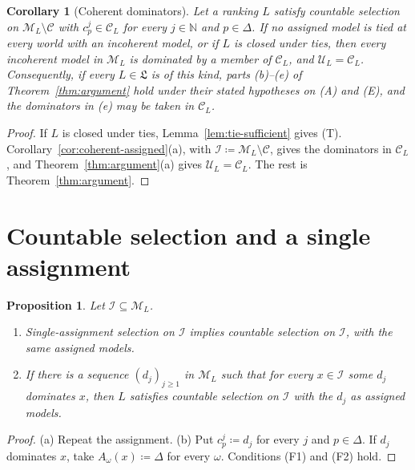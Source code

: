 \documentclass[11pt]{article}
\newtheorem{proposition}[theorem]{Proposition}
\newtheorem{corollary}[theorem]{Corollary}
\theoremstyle{definition}
\theoremstyle{remark}
\newcommand{\M}{\mathcal M}
\newcommand{\C}{\mathcal C}
\newcommand{\I}{\mathcal I}
\newcommand{\U}{\mathcal U}
\newcommand{\Lf}{\mathfrak L}
\begin{document}
\begin{corollary}[Coherent dominators]\label{cor:coherent-dominators}
Let a ranking $L$ satisfy countable selection on $\M_L\setminus\C$ with {\color{red}$c^j_p\in\C_L$ for every $j\in\mathbb N$ and $p\in\Delta$}. If {\color{red}no assigned model is tied at every world with an incoherent model}, or if $L$ is closed under ties, then every incoherent model in $\M_L$ is dominated by a member of $\C_L$, and $\U_L=\C_L$. Consequently, if every $L\in\Lf$ is of this kind, parts (b)--(e) of Theorem~\ref{thm:argument} hold under their stated hypotheses on (A) and (E), and the dominators in (e) may be taken in $\C_L$.
\end{corollary}
\begin{proof}
If $L$ is closed under ties, Lemma~\ref{lem:tie-sufficient} gives {\color{red}(T)}. Corollary~\ref{cor:coherent-assigned}(a), with $\I\coloneqq\M_L\setminus\C$, gives the dominators in $\C_L$, and Theorem~\ref{thm:argument}(a) gives $\U_L=\C_L$. The rest is Theorem~\ref{thm:argument}.
\end{proof}

\section{Countable selection and a single assignment}\label{sec:scope}

\begin{proposition}\label{prop:comparison}
Let $\I\subseteq\M_L$.
\begin{enumerate}[label=(\alph*)]
\item Single-assignment selection on $\I$ implies countable selection on $\I${\color{red}, with the same assigned models}.
\item If there is a sequence $(d_j)_{j\ge1}$ in $\M_L$ such that for every $x\in\I$ some $d_j$ dominates $x$, {\color{red}then $L$ satisfies countable selection on $\I$ with the $d_j$ as assigned models.}
\end{enumerate}
\end{proposition}
\begin{proof}
(a) Repeat the assignment. (b) {\color{red}Put $c^j_p\coloneqq d_j$ for every $j$ and $p\in\Delta$. If $d_j$ dominates $x$, take $A_\omega(x)\coloneqq\Delta$ for every $\omega$. Conditions (F1) and (F2) hold.}
\end{proof}
\end{document}
